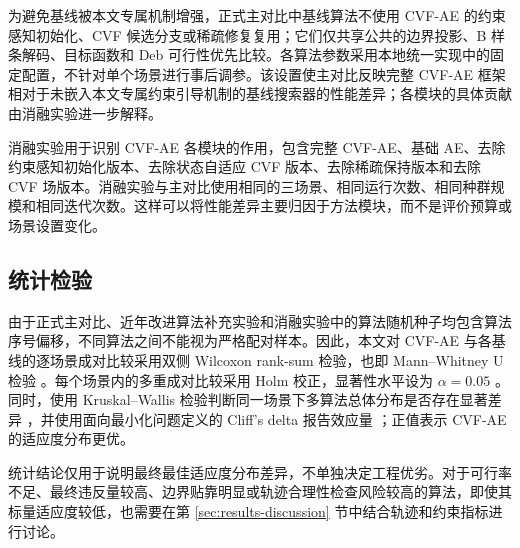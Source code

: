 为避免基线被本文专属机制增强，正式主对比中基线算法不使用 CVF-AE 的约束感知初始化、CVF 候选分支或稀疏修复复用；它们仅共享公共的边界投影、B 样条解码、目标函数和 Deb 可行性优先比较。各算法参数采用本地统一实现中的固定配置，不针对单个场景进行事后调参。该设置使主对比反映完整 CVF-AE 框架相对于未嵌入本文专属约束引导机制的基线搜索器的性能差异；各模块的具体贡献由消融实验进一步解释。

消融实验用于识别 CVF-AE 各模块的作用，包含完整 CVF-AE、基础 AE、去除约束感知初始化版本、去除状态自适应 CVF 版本、去除稀疏保持版本和去除 CVF 场版本。消融实验与主对比使用相同的三场景、相同运行次数、相同种群规模和相同迭代次数。这样可以将性能差异主要归因于方法模块，而不是评价预算或场景设置变化。

\subsection{统计检验}

由于正式主对比、近年改进算法补充实验和消融实验中的算法随机种子均包含算法序号偏移，不同算法之间不能视为严格配对样本。因此，本文对 CVF-AE 与各基线的逐场景成对比较采用双侧 Wilcoxon rank-sum 检验，也即 Mann--Whitney U 检验 \citep{Mann1947RankSum}。每个场景内的多重成对比较采用 Holm 校正，显著性水平设为 $\alpha=0.05$ \citep{Holm1979Sequential}。同时，使用 Kruskal--Wallis 检验判断同一场景下多算法总体分布是否存在显著差异 \citep{Kruskal1952RankVariance}，并使用面向最小化问题定义的 Cliff's delta 报告效应量 \citep{Cliff1993Dominance}；正值表示 CVF-AE 的适应度分布更优。

统计结论仅用于说明最终最佳适应度分布差异，不单独决定工程优劣。对于可行率不足、最终违反量较高、边界贴靠明显或轨迹合理性检查风险较高的算法，即使其标量适应度较低，也需要在第 \ref{sec:results-discussion} 节中结合轨迹和约束指标进行讨论。
